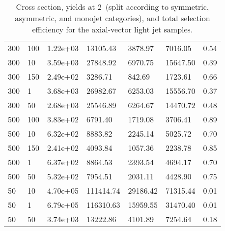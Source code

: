 \begin{table}
\begin{tabular}{lllllll}
300       &   100       &   1.22e+03  &   13105.43  &   3878.97   &   7016.05   &   0.54      \\ 
300       &   10        &   3.59e+03  &   27848.92  &   6970.75   &   15647.50  &   0.39      \\ 
300       &   150       &   2.49e+02  &   3286.71   &   842.69    &   1723.61   &   0.66      \\ 
300       &   1         &   3.68e+03  &   26982.67  &   6253.03   &   15556.70  &   0.37      \\ 
300       &   50        &   2.68e+03  &   25546.89  &   6264.67   &   14470.72  &   0.48      \\ 
500       &   100       &   3.83e+02  &   6791.40   &   1719.08   &   3706.41   &   0.89      \\ 
500       &   10        &   6.32e+02  &   8883.82   &   2245.14   &   5025.72   &   0.70      \\ 
500       &   150       &   2.41e+02  &   4093.84   &   1057.36   &   2238.78   &   0.85      \\ 
500       &   1         &   6.37e+02  &   8864.53   &   2393.54   &   4694.17   &   0.70      \\ 
500       &   50        &   5.32e+02  &   7954.51   &   2031.11   &   4428.90   &   0.75      \\ 
50        &   10        &   4.70e+05  &   111414.74 &   29186.42  &   71315.44  &   0.01      \\ 
50        &   1         &   6.79e+05  &   116310.63 &   15959.55  &   31470.40  &   0.01      \\ 
50        &   50        &   3.74e+03  &   13222.86  &   4101.89   &   7254.64   &   0.18      \\ 
\hline
\end{tabular}
\caption{Cross section, yields at 2~\ifb (split according to symmetric, asymmetric, and monojet categories), and total selection efficiency for the axial-vector light jet samples.}
\label{tab:dm_A_g1_2fb}
\end{table}
